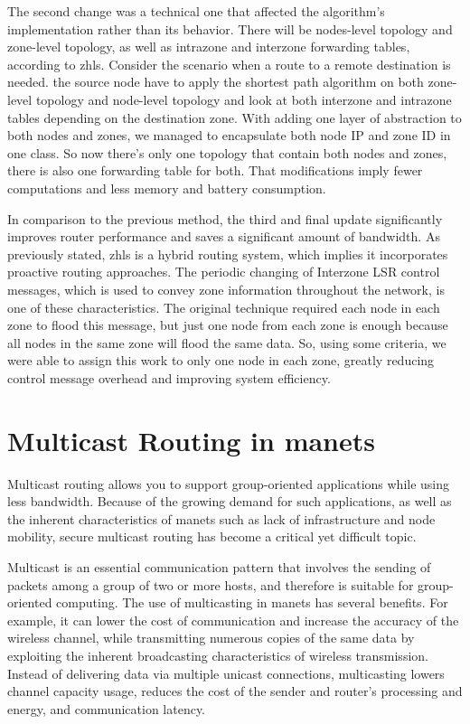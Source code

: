 The second change was a technical one that affected the algorithm's implementation rather than its behavior. There will be nodes-level topology and zone-level topology, as well as intrazone and interzone forwarding tables, according to \acrshort{zhls}. Consider the scenario when a route to a remote destination is needed. the source node have to apply the shortest path algorithm on both zone-level topology and node-level topology and look at both interzone and intrazone tables depending on the destination zone. With adding one layer of abstraction to both nodes and zones, we managed to encapsulate both node IP and zone ID in one class. So now there's only one topology that contain both nodes and zones, there is also one forwarding table for both. That modifications imply fewer computations and less memory and battery consumption.

In comparison to the previous method, the third and final update significantly improves router performance and saves a significant amount of bandwidth. As previously stated, \acrshort{zhls} is a hybrid routing system, which implies it incorporates proactive routing approaches. The periodic changing of Interzone LSR control messages, which is used to convey zone information throughout the network, is one of these characteristics. The original technique required each node in each zone to flood this message, but just one node from each zone is enough because all nodes in the same zone will flood the same data. So, using some criteria, we were able to assign this work to only one node in each zone, greatly reducing control message overhead and improving system efficiency.


\section{Multicast Routing in \acrshort{manets}}
Multicast routing allows you to support group-oriented applications while using less bandwidth. Because of the growing demand for such applications, as well as the inherent characteristics of \acrshort{manets} such as lack of infrastructure and node mobility, secure multicast routing has become a critical yet difficult topic.

Multicast is an essential communication pattern that involves the sending of packets among a group of two or more hosts, and therefore is suitable for group-oriented computing. The use of multicasting in \acrshort{manets} has several benefits. For example, it can lower the cost of communication and increase the accuracy of the wireless channel, while transmitting numerous copies of the same data by exploiting the inherent broadcasting characteristics of wireless transmission. Instead of delivering data via multiple unicast connections, multicasting lowers channel capacity usage, reduces the cost of the sender and router's processing and energy, and communication latency. \cite{junhai2008research} \cite{junhai2009survey}

